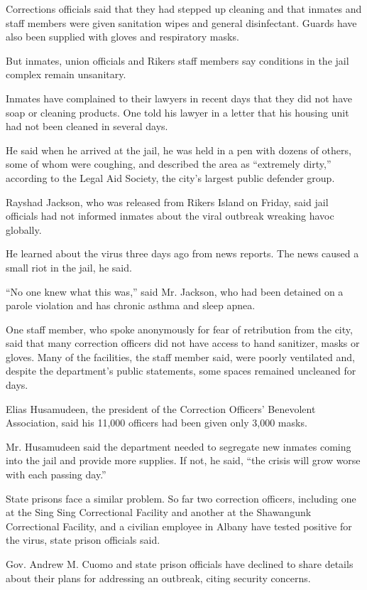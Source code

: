 Corrections officials said that they had stepped up cleaning and that
inmates and staff members were given sanitation wipes and general
disinfectant. Guards have also been supplied with gloves and respiratory
masks.

But inmates, union officials and Rikers staff members say conditions in
the jail complex remain unsanitary.

Inmates have complained to their lawyers in recent days that they did
not have soap or cleaning products. One told his lawyer in a letter that
his housing unit had not been cleaned in several days.

He said when he arrived at the jail, he was held in a pen with dozens of
others, some of whom were coughing, and described the area as
``extremely dirty,'' according to the Legal Aid Society, the city's
largest public defender group.

Rayshad Jackson, who was released from Rikers Island on Friday, said
jail officials had not informed inmates about the viral outbreak
wreaking havoc globally.

He learned about the virus three days ago from news reports. The news
caused a small riot in the jail, he said.

``No one knew what this was,'' said Mr. Jackson, who had been detained
on a parole violation and has chronic asthma and sleep apnea.

One staff member, who spoke anonymously for fear of retribution from the
city, said that many correction officers did not have access to hand
sanitizer, masks or gloves. Many of the facilities, the staff member
said, were poorly ventilated and, despite the department's public
statements, some spaces remained uncleaned for days.

Elias Husamudeen, the president of the Correction Officers' Benevolent
Association, said his 11,000 officers had been given only 3,000 masks.

Mr. Husamudeen said the department needed to segregate new inmates
coming into the jail and provide more supplies. If not, he said, ``the
crisis will grow worse with each passing day.''

State prisons face a similar problem. So far two correction officers,
including one at the Sing Sing Correctional Facility and another at the
Shawangunk Correctional Facility, and a civilian employee in Albany have
tested positive for the virus, state prison officials said.

Gov. Andrew M. Cuomo and state prison officials have declined to share
details about their plans for addressing an outbreak, citing security
concerns.

